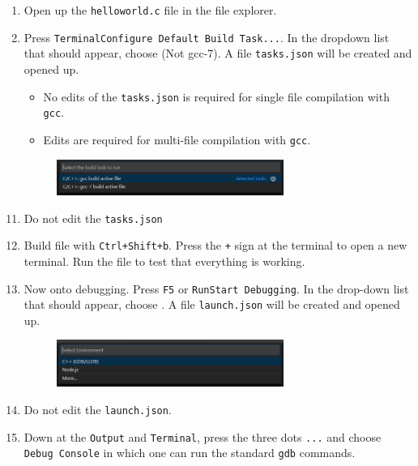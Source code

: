 \begin{enumerate}
    \item Open up the \texttt{helloworld.c} file in the file explorer.
    
    \item Press \texttt{Terminal\ra Configure Default Build Task...}. In the dropdown list that should appear, choose  (Not gcc-7). A file \texttt{tasks.json} will be created and opened up.
    \begin{itemize}
        \item No edits of the \texttt{tasks.json} is required for single file compilation with \texttt{gcc}.
        \item Edits are required for multi-file compilation with \texttt{gcc}.
    \end{itemize}

    \begin{figure}[H]
        \centering
        \includegraphics[width=0.7\textwidth]{figures/vscode_compiler.PNG}
    \end{figure}

\end{enumerate}


\begin{enumerate}
    \setcounter{enumi}{10}

    \item Do not edit the \texttt{tasks.json}
    
    \item Build file with \texttt{Ctrl+Shift+b}. Press the \texttt{+} sign at the terminal to open a new terminal. Run the file  to test that everything is working.
    
    \item Now onto debugging. Press \texttt{F5} or \texttt{Run\ra Start Debugging}. In the drop-down list that should appear, choose . A file \texttt{launch.json} will be created and opened up.

    \begin{figure}[H]
        \centering
        \includegraphics[width=0.7\textwidth]{figures/vscode_debugger.PNG}
    \end{figure}

    \item Do not edit the \texttt{launch.json}.
    
    \item Down at the \texttt{Output} and \texttt{Terminal}, press the three dots \texttt{...} and choose \texttt{Debug Console} in which one can run the standard \texttt{gdb} commands.
    
\end{enumerate}


